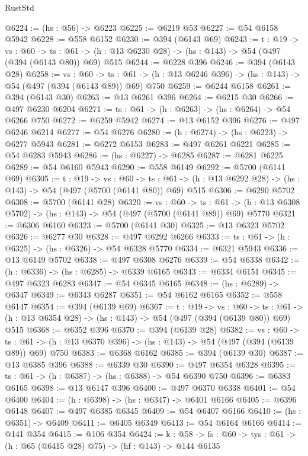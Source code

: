 \begin{lexlean}{RustStd}
\begin{coremodule}
@6224 := (hs : @56) -> @6223
@6225 := @6219 @53
@6227 := @54 @6158 @5942
@6228 := @558 @6152
@6230 := @394 (@6143 @69)
@6243 := {t : @19} ->
  {vs : @60} ->
  {ts : @61} -> (h : @13 @6230 @28) -> (hs : @143) -> @54 (@497 (@394 (@6143 @80)) @69) @515
@6244 := @6228 @396
@6246 := @394 (@6143 @28)
@6258 := {vs : @60} ->
  {ts : @61} -> (h : @13 @6246 @396) -> (hs : @143) -> @54 (@497 (@394 (@6143 @89)) @69) @750
@6259 := @6244 @6158
@6261 := @394 (@6143 @30)
@6263 := @13 @6261 @396
@6264 := @6215 @30
@6266 := @497 @6230 @6204
@6271 := {ts : @61} -> (h : @6263) -> (hs : @6264) -> @54 @6266 @750
@6272 := @6259 @5942
@6274 := @13 @6152 @396
@6276 := @497 @6246 @6214
@6277 := @54 @6276
@6280 := (h : @6274) -> (hs : @6223) -> @6277 @5943
@6281 := @6272 @6153
@6283 := @497 @6261 @6221
@6285 := @54 @6283 @5943
@6286 := (hs : @6227) -> @6285
@6287 := @6281 @6225
@6289 := @54 @6160 @5943
@6290 := @558 @6149
@6292 := @5700 (@6141 @69)
@6305 := {t : @19} ->
  {vs : @60} ->
  {ts : @61} -> (h : @13 @6292 @28) -> (hs : @143) -> @54 (@497 (@5700 (@6141 @80)) @69) @515
@6306 := @6290 @5702
@6308 := @5700 (@6141 @28)
@6320 := {vs : @60} ->
  {ts : @61} -> (h : @13 @6308 @5702) -> (hs : @143) -> @54 (@497 (@5700 (@6141 @89)) @69) @5770
@6321 := @6306 @6160
@6323 := @5700 (@6141 @30)
@6325 := @13 @6323 @5702
@6326 := @6277 @30
@6328 := @497 @6292 @6266
@6333 := {ts : @61} -> (h : @6325) -> (hs : @6326) -> @54 @6328 @5770
@6334 := @6321 @5943
@6336 := @13 @6149 @5702
@6338 := @497 @6308 @6276
@6339 := @54 @6338
@6342 := (h : @6336) -> (hs : @6285) -> @6339 @6165
@6343 := @6334 @6151
@6345 := @497 @6323 @6283
@6347 := @54 @6345 @6165
@6348 := (hs : @6289) -> @6347
@6349 := @6343 @6287
@6351 := @54 @6162 @6165
@6352 := @558 @6147
@6354 := @394 (@6139 @69)
@6367 := {t : @19} ->
  {vs : @60} ->
  {ts : @61} -> (h : @13 @6354 @28) -> (hs : @143) -> @54 (@497 (@394 (@6139 @80)) @69) @515
@6368 := @6352 @396
@6370 := @394 (@6139 @28)
@6382 := {vs : @60} ->
  {ts : @61} -> (h : @13 @6370 @396) -> (hs : @143) -> @54 (@497 (@394 (@6139 @89)) @69) @750
@6383 := @6368 @6162
@6385 := @394 (@6139 @30)
@6387 := @13 @6385 @396
@6388 := @6339 @30
@6390 := @497 @6354 @6328
@6395 := {ts : @61} -> (h : @6387) -> (hs : @6388) -> @54 @6390 @750
@6396 := @6383 @6165
@6398 := @13 @6147 @396
@6400 := @497 @6370 @6338
@6401 := @54 @6400
@6404 := (h : @6398) -> (hs : @6347) -> @6401 @6166
@6405 := @6396 @6148
@6407 := @497 @6385 @6345
@6409 := @54 @6407 @6166
@6410 := (hs : @6351) -> @6409
@6411 := @6405 @6349
@6413 := @54 @6164 @6166
@6414 := @141 @354
@6415 := @106 @354
@6424 := {k : @58} ->
  {fs : @60} -> {tys : @61} -> (h : @65 (@6415 @28) @75) -> (hf : @143) -> @144 @6135

\end{coremodule}
\end{lexlean}
